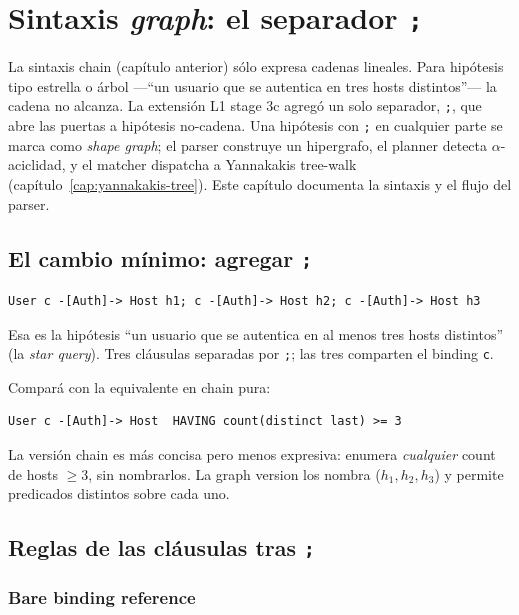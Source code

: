 \chapter{Sintaxis \emph{graph}: el separador \texttt{;}}
\label{cap:dsl-graph}

\begin{intuicion}
La sintaxis chain (capítulo anterior) sólo expresa cadenas
lineales. Para hipótesis tipo estrella o árbol ---``un usuario
que se autentica en tres hosts distintos''--- la cadena no alcanza.
La extensión L1 stage 3c agregó un solo separador, \texttt{;}, que
abre las puertas a hipótesis no-cadena. Una hipótesis con
\texttt{;} en cualquier parte se marca como \emph{shape graph}; el
parser construye un hipergrafo, el planner detecta
\(\alpha\)-aciclidad, y el matcher dispatcha a Yannakakis tree-walk
(capítulo~\ref{cap:yannakakis-tree}). Este capítulo documenta la
sintaxis y el flujo del parser.
\end{intuicion}

\section{El cambio mínimo: agregar \texttt{;}}

\begin{lstlisting}
User c -[Auth]-> Host h1; c -[Auth]-> Host h2; c -[Auth]-> Host h3
\end{lstlisting}

\noindent
Esa es la hipótesis ``un usuario que se autentica en al menos tres
hosts distintos'' (la \emph{star query}). Tres cláusulas separadas
por \texttt{;}; las tres comparten el binding \texttt{c}.

Compará con la equivalente en chain pura:
\begin{lstlisting}
User c -[Auth]-> Host  HAVING count(distinct last) >= 3
\end{lstlisting}

\noindent
La versión chain es más concisa pero menos expresiva: enumera
\emph{cualquier} count de hosts \(\geq 3\), sin nombrarlos. La
graph version los nombra (\(h_1, h_2, h_3\)) y permite predicados
distintos sobre cada uno.

\section{Reglas de las cláusulas tras \texttt{;}}

\subsection{Bare binding reference}

